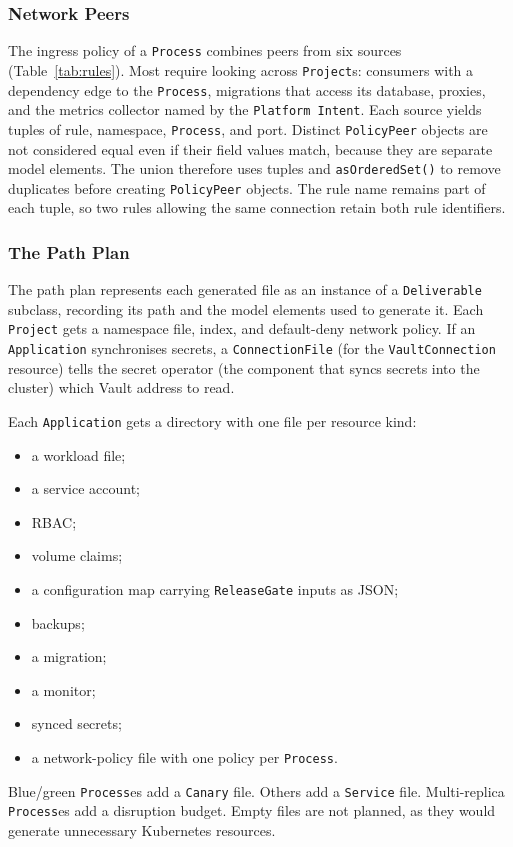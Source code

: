\subsubsection{Network Peers}
\label{sec:peers}

The ingress policy of a \texttt{Process} combines peers from six sources
(Table~\ref{tab:rules}). Most require looking across \texttt{Project}s:
consumers with a dependency edge to the \texttt{Process}, migrations that
access its database, proxies, and the metrics collector named by the
\texttt{Platform Intent}. Each source yields tuples of rule, namespace,
\texttt{Process}, and port. Distinct \texttt{PolicyPeer} objects are not considered equal even if their field values match, because they are separate model elements. The union therefore uses
tuples and \texttt{asOrderedSet()} to remove duplicates before creating
\texttt{PolicyPeer} objects. The rule name remains part of each tuple, so
two rules allowing the same connection retain both rule identifiers.

\subsubsection{The Path Plan}
\label{sec:pathplan}

The path plan represents each generated file as an instance of a
\texttt{Deliverable} subclass, recording its path and the model elements
used to generate it. Each \texttt{Project} gets a namespace file, index, and
default-deny network policy. If an \texttt{Application} synchronises secrets,
a \texttt{ConnectionFile} (for the \texttt{VaultConnection} resource) tells the secret operator (the component that syncs secrets into the cluster) which Vault
address to read.

Each \texttt{Application} gets a directory with one file per resource kind:
\begin{itemize}
  \item a workload file;
  \item a service account;
  \item RBAC;
  \item volume claims;
  \item a configuration map carrying \texttt{ReleaseGate} inputs as JSON;
  \item backups;
  \item a migration;
  \item a monitor;
  \item synced secrets;
  \item a network-policy file with one policy per \texttt{Process}.
\end{itemize}
Blue/green \texttt{Process}es add a \texttt{Canary} file.
Others add a \texttt{Service} file. Multi-replica \texttt{Process}es add a
disruption budget. Empty files are not planned, as they would generate unnecessary Kubernetes resources.

